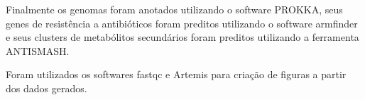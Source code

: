Finalmente os genomas foram anotados utilizando o software
PROKKA, seus genes de resistência a antibióticos foram preditos utilizando o software armfinder e seus clusters de metabólitos
secundários foram preditos utilizando a ferramenta ANTISMASH.

Foram utilizados os softwares fastqc e Artemis para criação de figuras a partir dos dados gerados.

